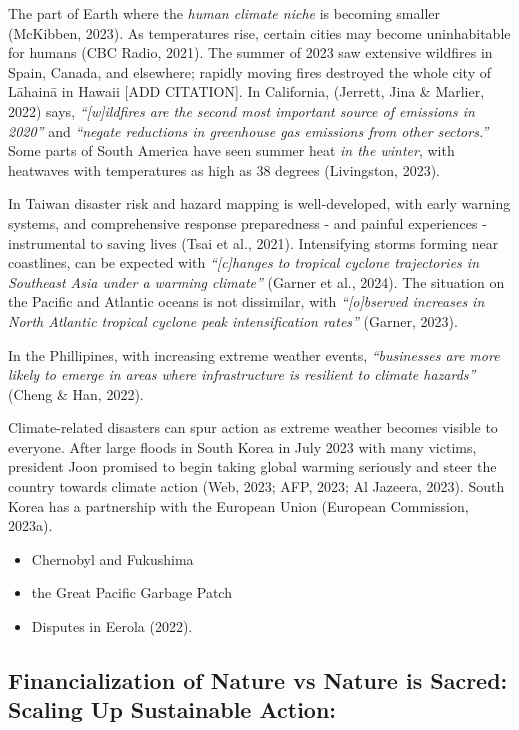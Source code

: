 \documentclass[
  letterpaper,
  DIV=11,
  numbers=noendperiod]{scrartcl}
\providecommand{\tightlist}{%
  \setlength{\itemsep}{0pt}\setlength{\parskip}{0pt}}\usepackage{longtable,booktabs,array}
\begin{document}
The part of Earth where the \emph{human climate niche} is becoming
smaller (McKibben, 2023). As temperatures rise, certain cities may
become uninhabitable for humans (CBC Radio, 2021). The summer of 2023
saw extensive wildfires in Spain, Canada, and elsewhere; rapidly moving
fires destroyed the whole city of Lāhainā in Hawaii {[}ADD CITATION{]}.
In California, (Jerrett, Jina \& Marlier, 2022) says,
\emph{``{[}w{]}ildfires are the second most important source of
emissions in 2020''} and \emph{``negate reductions in greenhouse gas
emissions from other sectors.''} Some parts of South America have seen
summer heat \emph{in the winter}, with heatwaves with temperatures as
high as 38 degrees (Livingston, 2023).

In Taiwan disaster risk and hazard mapping is well-developed, with early
warning systems, and comprehensive response preparedness - and painful
experiences - instrumental to saving lives (Tsai et al., 2021).
Intensifying storms forming near coastlines, can be expected with
\emph{``{[}c{]}hanges to tropical cyclone trajectories in Southeast Asia
under a warming climate''} (Garner et al., 2024). The situation on the
Pacific and Atlantic oceans is not dissimilar, with
\emph{``{[}o{]}bserved increases in North Atlantic tropical cyclone peak
intensification rates''} (Garner, 2023).

In the Phillipines, with increasing extreme weather events,
\emph{``businesses are more likely to emerge in areas where
infrastructure is resilient to climate hazards''} (Cheng \& Han, 2022).

Climate-related disasters can spur action as extreme weather becomes
visible to everyone. After large floods in South Korea in July 2023 with
many victims, president Joon promised to begin taking global warming
seriously and steer the country towards climate action (Web, 2023; AFP,
2023; Al Jazeera, 2023). South Korea has a partnership with the European
Union (European Commission, 2023a).

\begin{itemize}
\tightlist
\item
  Chernobyl and Fukushima
\item
  the Great Pacific Garbage Patch
\item
  Disputes in Eerola (2022).
\end{itemize}

\subsection{Financialization of Nature vs Nature is Sacred: Scaling Up
Sustainable
Action:}\label{financialization-of-nature-vs-nature-is-sacred-scaling-up-sustainable-action}
\end{document}
